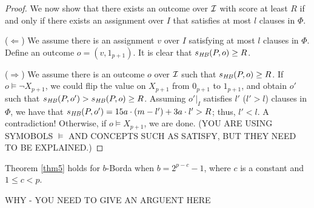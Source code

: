 \begin{proof}
We now show that there exists an outcome over $\mathcal{I}$ with score at least 
$R$ if and only if there exists an assignment over $I$ that satisfies at 
most $l$ clauses in $\Phi$.

\smallskip
\noindent
($\Leftarrow$) We assume there is an assignment $v$ over $I$ satisfying at 
most $l$ clauses in $\Phi$. Define an outcome $o=(v,1_{p+1})$. It is clear 
that $s_{\mathit{HB}}(P,o)\geq R$.

\smallskip
\noindent
($\Rightarrow$) We assume there is an outcome $o$ over $\mathcal{I}$ such that 
$s_{\mathit{HB}}(P,o)\geq R$. If $o \models \neg X_{p+1}$, we could flip the value 
on $X_{p+1}$ from $0_{p+1}$ to $1_{p+1}$, and obtain $o'$ such that 
$s_{\mathit{HB}}(P,o')>s_{\mathit{HB}}(P,o)\geq R$. Assuming $o'|_I$ satisfies $l'$ 
($l'>l$) clauses in $\Phi$, we have that 
$s_{\mathit{HB}}(P,o')=15a\cdot (m-l')+3a\cdot l'> R$; thus, $l'<l$. A contradiction!
Otherwise, if $o \models X_{p+1}$, we are done.
(YOU ARE USING SYMOBOLS $\models$ AND CONCEPTS SUCH AS SATISFY, BUT THEY NEED
TO BE EXPLAINED.) 
\end{proof}

\begin{cor}
	Theorem \ref{thm5} holds for $b$-Borda when 
	$b=2^{p-c}-1$, where $c$ is a constant and $1 \leq c < p$.
\end{cor}
WHY - YOU NEED TO GIVE AN ARGUENT HERE

